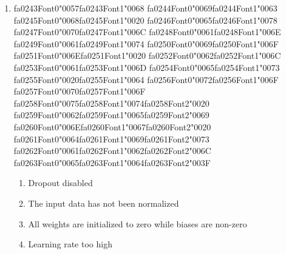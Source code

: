 \documentclass[12pt]{article}
\begin{document}
\begin{enumerate}[label=Q\arabic*.]
 \begin{enumerate}[label=(\Alph*)]
     \item Cross-entropy loss misconfigured
     \item The final layer is using Softmax without temperature scaling
     \item Learning rate too high
     \item All pre-activation values are negative in the first layer
 \end{enumerate}
 
 \item {\csname fa0243Font0\endcsname\char"0057}{\csname fa0243Font1\endcsname\char"0068} {\csname fa0244Font0\endcsname\char"0069}{\csname fa0244Font1\endcsname\char"0063} {\csname fa0245Font0\endcsname\char"0068}{\csname fa0245Font1\endcsname\char"0020} {\csname fa0246Font0\endcsname\char"0065}{\csname fa0246Font1\endcsname\char"0078} {\csname fa0247Font0\endcsname\char"0070}{\csname fa0247Font1\endcsname\char"006C} {\csname fa0248Font0\endcsname\char"0061}{\csname fa0248Font1\endcsname\char"006E} {\csname fa0249Font0\endcsname\char"0061}{\csname fa0249Font1\endcsname\char"0074} {\csname fa0250Font0\endcsname\char"0069}{\csname fa0250Font1\endcsname\char"006F} {\csname fa0251Font0\endcsname\char"006E}{\csname fa0251Font1\endcsname\char"0020} {\csname fa0252Font0\endcsname\char"0062}{\csname fa0252Font1\endcsname\char"006C} {\csname fa0253Font0\endcsname\char"0061}{\csname fa0253Font1\endcsname\char"006D} {\csname fa0254Font0\endcsname\char"0065}{\csname fa0254Font1\endcsname\char"0073} {\csname fa0255Font0\endcsname\char"0020}{\csname fa0255Font1\endcsname\char"0064} {\csname fa0256Font0\endcsname\char"0072}{\csname fa0256Font1\endcsname\char"006F} {\csname fa0257Font0\endcsname\char"0070}{\csname fa0257Font1\endcsname\char"006F} {\csname fa0258Font0\endcsname\char"0075}{\csname fa0258Font1\endcsname\char"0074}{\csname fa0258Font2\endcsname\char"0020} {\csname fa0259Font0\endcsname\char"0062}{\csname fa0259Font1\endcsname\char"0065}{\csname fa0259Font2\endcsname\char"0069} {\csname fa0260Font0\endcsname\char"006E}{\csname fa0260Font1\endcsname\char"0067}{\csname fa0260Font2\endcsname\char"0020} {\csname fa0261Font0\endcsname\char"0064}{\csname fa0261Font1\endcsname\char"0069}{\csname fa0261Font2\endcsname\char"0073} {\csname fa0262Font0\endcsname\char"0061}{\csname fa0262Font1\endcsname\char"0062}{\csname fa0262Font2\endcsname\char"006C} {\csname fa0263Font0\endcsname\char"0065}{\csname fa0263Font1\endcsname\char"0064}{\csname fa0263Font2\endcsname\char"003F}
 \begin{enumerate}[label=(\Alph*)]
     \item Dropout disabled
     \item The input data has not been normalized
     \item All weights are initialized to zero while biases are non-zero
     \item Learning rate too high
 \end{enumerate}
 

\end{enumerate}
\end{document}
